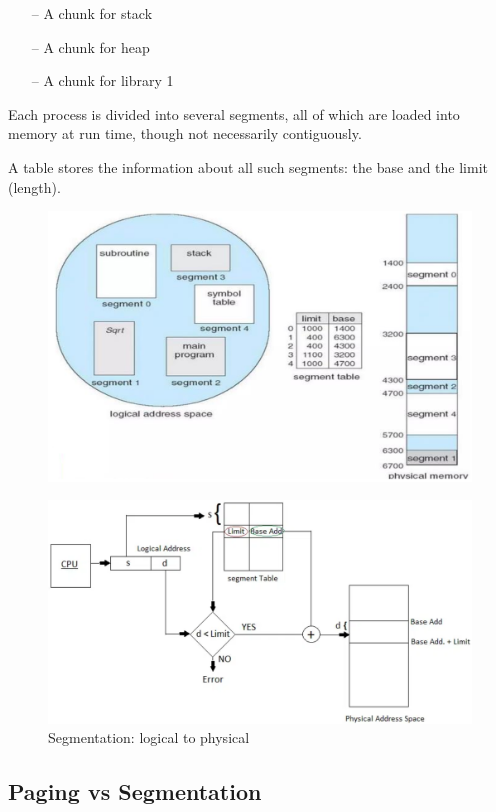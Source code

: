 \begin{itemize}
    \item[--] A chunk for stack
    \item[--] A chunk for heap
    \item[--] A chunk for library 1
\end{itemize}

Each process is divided into several segments, all of which are loaded
into memory at run time, though not necessarily contiguously. 

A table stores the information about all such segments: the base and the limit (length).

\begin{figure}[h!]
    \centering
    \includegraphics[width=0.75\linewidth]{img/dgn.png}
\end{figure}

\begin{figure}[h!]
    \centering
    \includegraphics[width=0.75\linewidth]{img/dasv.png}
    \caption{Segmentation: logical to physical}
\end{figure}

\newpage
\subsection{Paging vs Segmentation}

